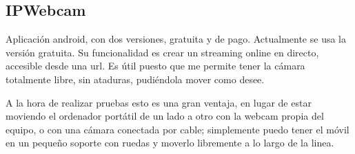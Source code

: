 \subsection{IPWebcam}
Aplicación android, con dos versiones, gratuita y de pago. Actualmente se usa la versión gratuita.
Su funcionalidad es crear un streaming online en directo, accesible desde una url. Es útil puesto que me permite tener la cámara totalmente libre, sin ataduras, pudiéndola mover como desee.

A la hora de realizar pruebas esto es una gran ventaja, en lugar de estar moviendo el ordenador portátil de un lado a otro con la webcam propia del equipo, o con una cámara conectada por cable; simplemente puedo tener el móvil en un pequeño soporte con ruedas y moverlo libremente a lo largo de la linea.





 
